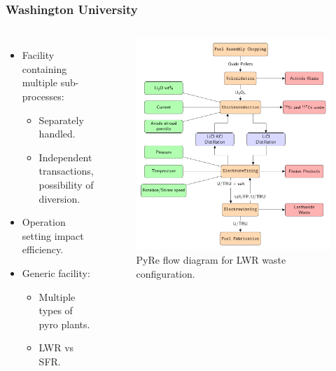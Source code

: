 \begin{frame}
\frametitle{Washington University}
\begin{columns}
	\column[t]{5cm}
	\begin{itemize}
		\item Facility containing multiple sub-processes:
		\begin{itemize}
			\item Separately handled.
			\item Independent transactions, possibility of diversion.
		\end{itemize}
		\item Operation setting impact efficiency.
		\item Generic facility:
		\begin{itemize}
			\item Multiple types of pyro plants.
			\item LWR vs SFR.
		\end{itemize}
	\end{itemize}
	\column[t]{6cm}
	\begin{figure}
		\includegraphics[width=\linewidth]{./images/westphal-pyre.pdf}
		\caption{PyRe flow diagram for LWR waste configuration.}
		\label{fig:pyre}
	\end{figure}
\end{columns}
\end{frame}

